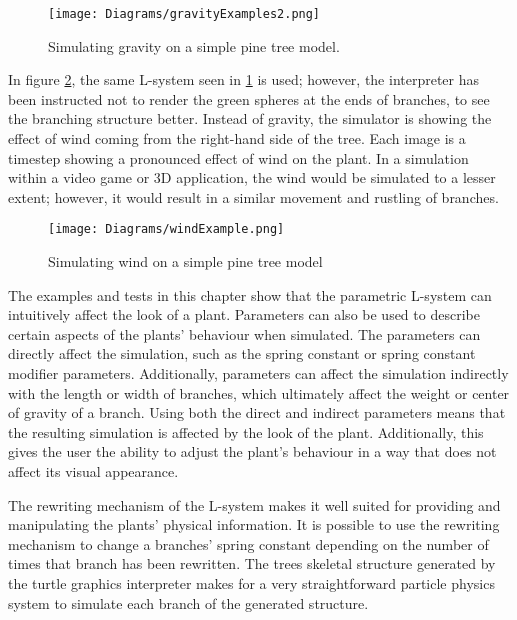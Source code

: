 \begin{figure}[htbp]
	{\centering
		\vspace{7px}
		\texttt{[image: Diagrams/gravityExamples2.png]}
		\label{3DAxisFigure} 
		\caption{Simulating gravity on a simple pine tree model.} \label{Gravity applied to generated model 2}
	}
\end{figure}
\FloatBarrier

\noindent
In figure \ref{Wind applied to generated model}, the same L-system seen in \ref{Gravity applied to generated model 2} is used; however, the interpreter has been instructed not to render the green spheres at the ends of branches, to see the branching structure better. Instead of gravity, the simulator is showing the effect of wind coming from the right-hand side of the tree. Each image is a timestep showing a pronounced effect of wind on the plant. In a simulation within a video game or 3D application, the wind would be simulated to a lesser extent; however, it would result in a similar movement and rustling of branches.

\begin{figure}[htbp]
	{\centering
		\vspace{7px}
		\texttt{[image: Diagrams/windExample.png]}
		\caption{Simulating wind on a simple pine tree model}\label{Wind applied to generated model}
	}
\end{figure}
\FloatBarrier

\noindent
The examples and tests in this chapter show that the parametric L-system can intuitively affect the look of a plant. Parameters can also be used to describe certain aspects of the plants' behaviour when simulated. The parameters can directly affect the simulation, such as the spring constant or spring constant modifier parameters. Additionally, parameters can affect the simulation indirectly with the length or width of branches, which ultimately affect the weight or center of gravity of a branch. Using both the direct and indirect parameters means that the resulting simulation is affected by the look of the plant. Additionally, this gives the user the ability to adjust the plant's behaviour in a way that does not affect its visual appearance. 

The rewriting mechanism of the L-system makes it well suited for providing and manipulating the plants' physical information.  It is possible to use the rewriting mechanism to change a branches' spring constant depending on the number of times that branch has been rewritten. The trees skeletal structure generated by the turtle graphics interpreter makes for a very straightforward particle physics system to simulate each branch of the generated structure. 



